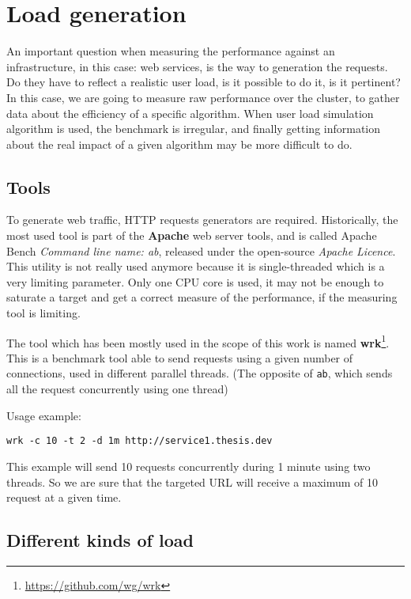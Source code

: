 \section{Load generation}

An important question when measuring the performance against an infrastructure,
in this case: web services, is the way to generation the requests. Do they
have to reflect a realistic user load, is it possible to do it, is it pertinent?
In this case, we are going to measure raw performance over the cluster, to gather
data about the efficiency of a specific algorithm. When user load simulation algorithm
is used, the benchmark is irregular, and finally getting information about
the real impact of a given algorithm may be more difficult to do.

\subsection{Tools}

To generate web traffic, HTTP requests generators are required. Historically,
the most used tool is part of the \textbf{Apache} web server tools, and is
called Apache Bench \textit{Command line name: ab}, released under the open-source
\textit{Apache Licence}. This utility is not really
used anymore because it is single-threaded which is a very limiting parameter.
Only one CPU core is used, it may not be enough to saturate a target and get a
correct measure of the performance, if the measuring tool is limiting.

The tool which has been mostly used in the scope of this work is named
\textbf{wrk}\footnote{\url{https://github.com/wg/wrk}}. This is a benchmark
tool able to send requests using a given number of connections, used in
different parallel threads. (The opposite of \texttt{ab}, which sends all
the request concurrently using one thread)

Usage example:

\vspace{1em}
\begin{lstlisting}
wrk -c 10 -t 2 -d 1m http://service1.thesis.dev
\end{lstlisting}

This example will send 10 requests concurrently during 1 minute using two threads.
So we are sure that the targeted URL will receive a maximum of 10 request at a
given time.

\subsection{Different kinds of load}

